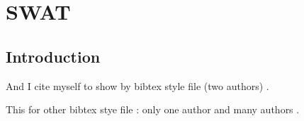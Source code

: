\chapter{SWAT}
\label{chap:appendix2}

\section{Introduction}

And I cite myself to show by bibtex style file (two authors) \cite{Commowick_MICCAI_2007}.

This for other bibtex stye file : only one author \cite{Oakes_RStat_1999} and many authors \cite{Guimond_CVIU_2000}.